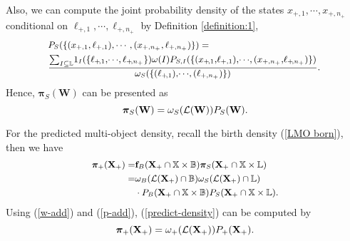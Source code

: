 \documentclass[journal]{IEEEtran}
\newcommand{\bff}{{\mathbf{f}}}
\newcommand{\bW}{{\mathbf W}}
\newcommand{\bX}{{\mathbf X}}
\newcommand{\bpi}{{\boldsymbol\pi}}
\begin{document}
{\begin{equation}
\end{equation}
Also, we can compute the joint probability density of the states $x_{+,1},\!\cdots\!,x_{+,n_+}$ conditional on $\ell_{+,1},\!\cdots\!,\ell_{+,n_+}$ by Definition \ref{definition:1}, 
\begin{equation}\notag
{\small
\!\!
\begin{split}
&P_S(\{(x_{+,1},\ell_{+,1}),\cdots,(x_{+,n_+},\ell_{+,n_+})\})=\\
&\frac{\sum_{I\subseteq\mathbb{L}}\!1_{I}(\{\ell_{+\!,1},\!\cdots\!,\ell_{+\!,n_+}\})\omega(I)P_{S,I}(\{(x_{+\!,1},\!\ell_{+,1}),\!\cdots\!,(x_{+,n_+},\!\ell_{+\!,n_+})\})}{\omega_{S}(\{(\ell_{+\!,1}),\!\cdots\!,(\ell_{+,n_+})\})}.
\end{split}
}
\end{equation}
Hence, $\bpi_S(\bW)$  can be presented as
\begin{equation}\label{surving-density-3}
{\small
\bpi_S(\bW)=\omega_S(\mathcal{L}(\bW))P_S(\bW).
}
\end{equation}


For the predicted multi-object density, recall the birth density (\ref{LMO born}), then we have
\begin{equation}\label{predict-density}
{\small
\begin{split}
\bpi_+(\bX_+)
=&\bff_B(\bX_+\cap\mathbb{X}\times\mathbb{B})\bpi_S(\bX_+\cap\mathbb{X}\times\mathbb{L})\\
=&\omega_B(\mathcal{L}(\bX_+)\cap\mathbb{B})\omega_S(\mathcal{L}(\bX_+)\cap\mathbb{L}) \\&\cdot P_B(\bX_+\cap\mathbb{X}\times\mathbb{B})P_S(\bX_+\cap\mathbb{X}\times\mathbb{L}).
\end{split}}
\end{equation}
Using (\ref{w-add}) and (\ref{p-add}), (\ref{predict-density}) can be computed by
\begin{equation}\label{predict-density-2}
{\small
\bpi_+(\bX_+)=\omega_+(\mathcal{L}(\bX_+))P_+(\bX_+).
}
\end{equation}
}
\end{document}
